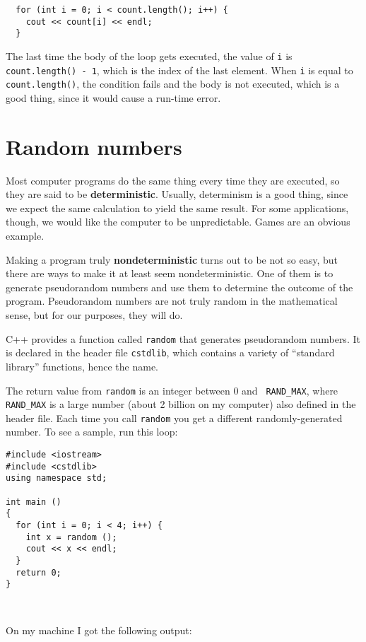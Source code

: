 \begin{verbatim}
  for (int i = 0; i < count.length(); i++) {
    cout << count[i] << endl;
  }
\end{verbatim}
%
The last time the body of the loop gets executed, the value of {\tt i}
is {\tt count.length() - 1}, which is the index of the last element.  When
{\tt i} is equal to {\tt count.length()}, the condition fails and the body
is not executed, which is a good thing, since it would cause a
run-time error.

\section{Random numbers}
\label{random}
\label{pseudorandom}

Most computer programs do the same thing every time they are executed,
so they are said to be {\bf deterministic}.  Usually, determinism is a
good thing, since we expect the same calculation to yield the same
result.  For some applications, though, we would like the
computer to be unpredictable.  Games are an obvious example.

Making a program truly {\bf nondeterministic} turns out to be not
so easy, but there are ways to make it at least seem
nondeterministic.  One of them is to generate {pseudorandom} numbers and
use them to determine the outcome of the program.
Pseudorandom numbers
are not truly random in the mathematical sense, but 
for our purposes, they will do.

C++ provides a function called {\tt random} that generates
pseudorandom numbers.  It is declared in the
header file {\tt cstdlib}, which contains a variety of ``standard
library'' functions, hence the name.

The return value from {\tt random} is an integer between 0 and {\tt
RAND\_MAX}, where {\tt RAND\_MAX} is a large number (about 2 billion
on my computer) also defined in the header file.  Each time you call
{\tt random} you get a different randomly-generated number.  To see a
sample, run this loop:

\begin{verbatim}
#include <iostream>
#include <cstdlib>
using namespace std;

int main ()
{
  for (int i = 0; i < 4; i++) {
    int x = random ();
    cout << x << endl;
  }
  return 0;
}

  
\end{verbatim}
%
On my machine I got the following output:

